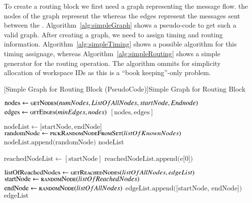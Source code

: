 To create a routing block we first need a graph representing the message flow. the nodes of the graph represent the \VortexNodes whereas the edges represent the messages sent between the \VortexNodes. Algorithm~\ref{alg:simpleGraph} shows a pseudo-code to get such a valid graph. After creating a graph, we need to assign timing and routing information. Algorithm~\ref{alg:simpleTiming} shows a possible algorithm for this timing assignage, whereas Algorithm~\ref{alg:simpleRouting} shows a simple generator for the routing operation. The algorithm ommits for simplicity allocation of workspace IDs as this is a ``book keeping''-only problem.

\begin{algorithm}
	[Simple Graph for Routing Block (PseudoCode)]{Simple Graph for Routing Block}\label{alg:simpleGraph}
	\begin{algorithmic}[1]
			\State $\text{nodes} \gets \Call{getNodes}{numNodes, ListOfAllNodes, startNode, Endnode}$
			\State $\text{edges} \gets \Call{getEdges}{minEdges,nodes}$
			\Return $[\text{nodes}, \text{edges}]$	
		\EndFunction
		\item[]		
		  \State $\text{nodeList} \gets \lbrack\text{startNode}, \text{endNode}\rbrack$
		  	\State $\text{randomNode} \gets \Call{pickRandomNodeFromSet}{listOfKnownNodes}$
		  		\State $\text{nodeList.append(randomNode)}$ 
		  	\EndIf	
		  \EndWhile{}	
		  \Return nodeList
		\EndFunction  
		\item[]
			\State $\text{reachedNodeList} \gets [\text{startNode}]$
					\State $\text{reachedNodeList.append(e[0])}$
				\EndIf
			\EndFor
		\EndFunction
		\item[]
				\State $\text{listOfReachedNodes} \gets \Call{getReachedNodes}{listOfAllNodes,edgeList}$
				\State $\text{startNode} \gets \Call{randomNode}{listOfReachedNodes}$
				\State $\text{endNode} \gets \Call{randomNode}{listOfAllNodes}$
				\State $\text{edgeList.append([startNode, endNode])}$
			\EndWhile{}
			\Return $\text{edgeList}$
		\EndFunction
	\end{algorithmic}
\end{algorithm}

